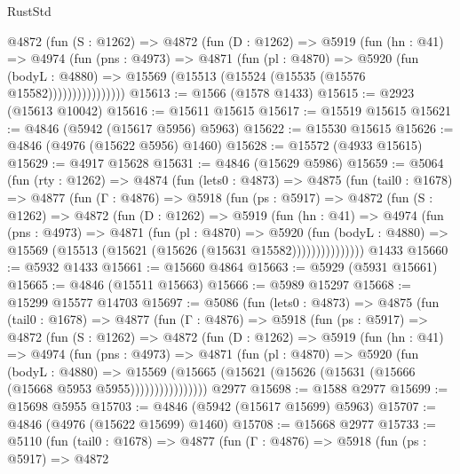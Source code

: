 \begin{lexlean}{RustStd}
\begin{coremodule}
              @4872
                (fun (S : @1262) =>
                @4872
                  (fun (D : @1262) =>
                  @5919
                    (fun (hn : @41) =>
                    @4974
                      (fun (pns : @4973) =>
                      @4871
                        (fun (pl : @4870) =>
                        @5920
                          (fun (bodyL : @4880) =>
                          @15569 (@15513 (@15524 (@15535 (@15576 @15582))))))))))))))))
@15613 := @1566 (@1578 @1433)
@15615 := @2923 (@15613 @10042)
@15616 := @15611 @15615
@15617 := @15519 @15615
@15621 := @4846 (@5942 (@15617 @5956) @5963)
@15622 := @15530 @15615
@15626 := @4846 (@4976 (@15622 @5956) @1460)
@15628 := @15572 (@4933 @15615)
@15629 := @4917 @15628
@15631 := @4846 (@15629 @5986)
@15659 := @5064
    (fun (rty : @1262) =>
    @4874
      (fun (lets0 : @4873) =>
      @4875
        (fun (tail0 : @1678) =>
        @4877
          (fun (Γ : @4876) =>
          @5918
            (fun (ps : @5917) =>
            @4872
              (fun (S : @1262) =>
              @4872
                (fun (D : @1262) =>
                @5919
                  (fun (hn : @41) =>
                  @4974
                    (fun (pns : @4973) =>
                    @4871
                      (fun (pl : @4870) =>
                      @5920
                        (fun (bodyL : @4880) =>
                        @15569 (@15513 (@15621 (@15626 (@15631 @15582)))))))))))))))
    @1433
@15660 := @5932 @1433
@15661 := @15660 @4864
@15663 := @5929 (@5931 @15661)
@15665 := @4846 (@15511 @15663)
@15666 := @5989 @15297
@15668 := @15299 @15577 @14703
@15697 := @5086
    (fun (lets0 : @4873) =>
    @4875
      (fun (tail0 : @1678) =>
      @4877
        (fun (Γ : @4876) =>
        @5918
          (fun (ps : @5917) =>
          @4872
            (fun (S : @1262) =>
            @4872
              (fun (D : @1262) =>
              @5919
                (fun (hn : @41) =>
                @4974
                  (fun (pns : @4973) =>
                  @4871
                    (fun (pl : @4870) =>
                    @5920
                      (fun (bodyL : @4880) =>
                      @15569
                        (@15665 (@15621 (@15626 (@15631 (@15666 (@15668 @5953 @5955))))))))))))))))
    @2977
@15698 := @1588 @2977
@15699 := @15698 @5955
@15703 := @4846 (@5942 (@15617 @15699) @5963)
@15707 := @4846 (@4976 (@15622 @15699) @1460)
@15708 := @15668 @2977
@15733 := @5110
    (fun (tail0 : @1678) =>
    @4877
      (fun (Γ : @4876) =>
      @5918
        (fun (ps : @5917) =>
        @4872

\end{coremodule}
\end{lexlean}
